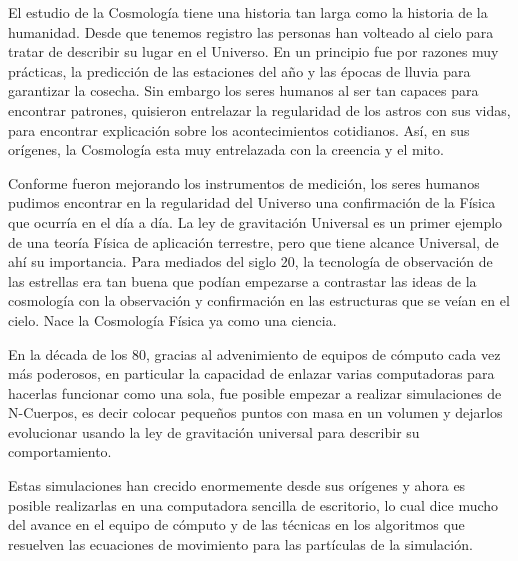 \setcounter{equation}{0}

\newcommand{\altname}{Introducción}
\lhead[\fancyplain{}{}]%
      {\fancyplain{}{\bfseries \altname}}
\addchap{\altname}

El estudio de la Cosmología tiene una historia tan larga como la historia de la humanidad. Desde que tenemos registro las personas han volteado al cielo para tratar de describir su lugar en el Universo. En un principio fue por razones muy prácticas, la predicción de las estaciones del año y las épocas de lluvia para garantizar la cosecha. Sin embargo los seres humanos al ser tan capaces para encontrar patrones, quisieron entrelazar la regularidad de los astros con sus vidas, para encontrar explicación sobre los acontecimientos cotidianos. Así, en sus orígenes, la Cosmología esta muy entrelazada con la creencia y el mito.

Conforme fueron mejorando los instrumentos de medición, los seres humanos pudimos encontrar en la regularidad del Universo una confirmación de la Física que ocurría en el día a día. La ley de gravitación Universal es un primer ejemplo de una teoría Física de aplicación terrestre, pero que tiene alcance Universal, de ahí su importancia. Para mediados del siglo 20, la tecnología de observación de las estrellas era tan buena que podían empezarse a contrastar las ideas de la cosmología con la observación y confirmación en las estructuras que se veían en el cielo. {\blues Nace la Cosmología Física ya como una ciencia. }%

En la década de los 80, gracias al advenimiento de equipos de cómputo cada vez más poderosos, en particular la capacidad de enlazar varias computadoras para hacerlas funcionar como una sola, fue posible empezar a realizar simulaciones de N-Cuerpos, es decir colocar pequeños puntos con masa en un volumen y dejarlos evolucionar usando la ley de gravitación universal para describir su comportamiento.

Estas simulaciones han crecido enormemente desde sus orígenes y ahora es posible realizarlas en una computadora sencilla de escritorio, lo cual dice mucho del avance en el equipo de cómputo y de las técnicas en los algoritmos que resuelven las ecuaciones de movimiento para las partículas de la simulación.

